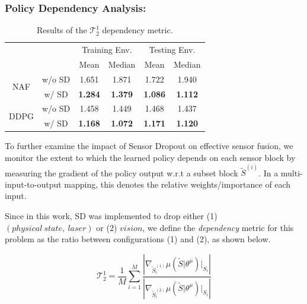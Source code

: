 \documentclass[../thesis.tex]{subfiles}
\begin{document}
\subsubsection{Policy Dependency Analysis:}

\begin{table}[t]
\begin{center}
\caption{Results of the $\mathcal{T}_2^1$ dependency metric.}
\label{table:policy-ratio}
\begin{small}
\begin{tabular}{cccccc}
\toprule 
\centering
 & & \multicolumn{2}{c}{Training Env.} & \multicolumn{2}{c}{Testing Env.}  \\
 & & Mean & Median & Mean & Median \\ \midrule \midrule
\multirow{2}{*}{NAF}  & w/o SD & 1.651 & 1.871 & 1.722 & 1.940 \\
                      & w/ SD  & \textbf{1.284} & \textbf{1.379} & \textbf{1.086} & \textbf{1.112} \\ \midrule
\multirow{2}{*}{DDPG} & w/o SD & 1.458 & 1.449 & 1.468 & 1.437 \\
                      & w/ SD  & \textbf{1.168} & \textbf{1.072} & \textbf{1.171} & \textbf{1.120} \\ \toprule
\end{tabular}
\end{small}
\end{center}
\end{table}


To further examine the impact of Sensor Dropout on effective sensor fusion, we monitor the extent to which the learned policy depends on each sensor block by measuring the gradient of the policy output w.r.t a subset block $\tilde{S}^{(i)}$. In a multi-input-to-output mapping, this denotes the relative weights/importance of each input. 

Since in this work, SD was implemented to drop either (1) $(physical~state,~ laser)$ or (2) $vision$, we define the \emph{dependency} metric for this problem as the ratio between configurations (1) and (2), as shown below.  

\begin{equation}
\mathcal{T}_2^1 = \frac{1}{M}\sum_{i=1}^M \frac{\left| \nabla_{\tilde{S}^{(1)}_i} \mu (\tilde{S} | \theta^\mu )\Big|_{S_i} \right|}{\left| \nabla_{\tilde{S}^{(2)}_i} \mu (\tilde{S} | \theta^\mu )\Big|_{S_i} \right|} 
\label{equ:grad_metric}
\end{equation}
\end{document}
